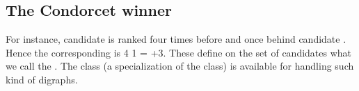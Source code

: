 \documentclass[a4paper,12pt,english]{sphinxhowto}
\begin{document}
\subsection{The Condorcet winner}
\label{\detokenize{tutorial:the-condorcet-winner}}
For instance, candidate  is ranked four times before and once behind candidate . Hence the corresponding   is 4 \sphinxhyphen{} 1 = +3. These  define on the set of candidates what we call the . The  class (a specialization of the  class) is available for handling such kind of digraphs.
\def\sphinxLiteralBlockLabel{\label{\detokenize{tutorial:condorcetdigraph}}}
\end{document}
